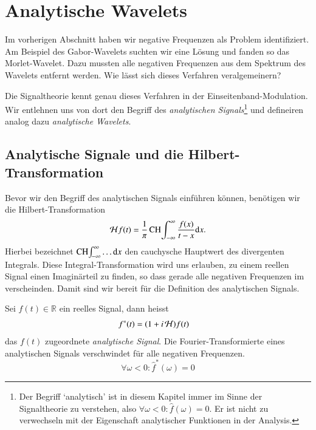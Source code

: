 \section{Analytische Wavelets}
Im vorherigen Abschnitt haben wir negative Frequenzen als Problem identifiziert.
Am Beispiel des Gabor-Wavelets suchten wir eine Lösung und fanden so das Morlet-Wavelet.
Dazu mussten alle negativen Frequenzen aus dem Spektrum des Wavelets entfernt werden.
Wie lässt sich dieses Verfahren veralgemeinern? 

Die Signaltheorie kennt genau dieses Verfahren in der Einseitenband-Modulation.
Wir entlehnen uns von dort den Begriff des \emph{analytischen Signals}\footnote{
	Der Begriff `analytisch' ist in diesem Kapitel immer im Sinne der Signaltheorie zu verstehen, also $\forall \omega < 0 \colon \hat f (\omega) = 0 $.
	Er ist nicht zu verwechseln mit der Eigenschaft analytischer Funktionen in der Analysis.
}
und defineiren analog dazu \emph{analytische Wavelets}.

\subsection{Analytische Signale und die Hilbert-Transformation}
Bevor wir den Begriff des analytischen Signals einführen können, benötigen wir die Hilbert-Transformation
\[
\Hilb f(t) =
\frac{1}{\pi} \CH\int_{-\infty}^{\infty}\frac{f(x)}{t-x} \mathrm{d}x.
\]
Hierbei bezeichnet $\CH\int_{-\infty}^{\infty} \dots \mathrm{d}x$ den cauchysche Hauptwert des divergenten Integrals.
Diese Integral-Transformation wird uns erlauben, zu einem reellen Signal einen Imaginärteil zu finden, so dass gerade alle negativen Frequenzen im verscheinden.
Damit sind wir bereit für die Definition des analytischen Signals.

\begin{satz}
	\label{complex:analytic-signal}
	Sei $f(t) \in \mathbb{R}$ ein reelles Signal, dann heisst
	\begin{align*}
		f^\ast(t) 
		&= (1 + i\Hilb\,)f(t)
	\end{align*}
	das $f(t)$ zugeordnete \emph{analytische Signal}.
	Die Fourier-Transformierte eines analytischen Signals verschwindet für alle negativen Frequenzen.
	\[
		\forall \omega < 0 \colon \hat{f}^\ast(\omega) = 0
	\]
\end{satz}

